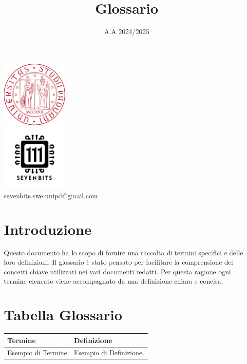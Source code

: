 \documentclass[12pt]{article}
\title{Glossario}
\date{A.A 2024/2025}
\begin{document}
\maketitle
\center 
\includegraphics[width=0.25\textwidth]{LogoUnipd}\\
\includegraphics[width=0.25\textwidth]{Sevenbitslogo}\\
sevenbits.swe.unipd@gmail.com\\
\vspace{2mm}

\raggedright
\tableofcontents
\newpage

\section{Introduzione}
Questo documento ha lo scopo di fornire una raccolta di termini specifici e delle loro definizioni. Il glossario è stato pensato per facilitare la comprensione dei concetti chiave utilizzati nei vari documenti redatti. Per questa ragione ogni termine elencato viene accompagnato da una definizione chiara e concisa.\\

\section{Tabella Glossario}

\renewcommand{\arraystretch}{1.5} %
\setlength{\tabcolsep}{10pt} %

\begin{tabularx}{\textwidth}{|>{\centering\arraybackslash}l|X|}
\hline
\rowcolor[gray]{0.9}
\textbf{Termine} & \textbf{Definizione}\\
\hline
\setlength{\arrayrulewidth}{0.5mm} %
Esempio di Termine & Esempio di Definizione.\\

\hline
\end{tabularx}
\end{document}
